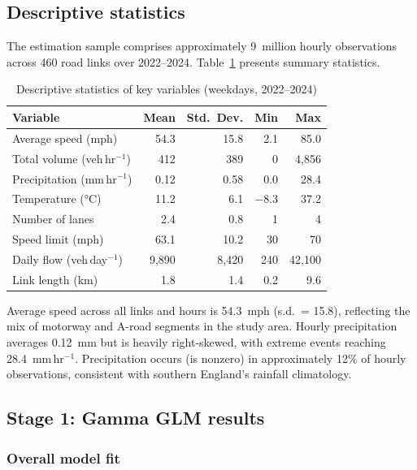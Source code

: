 \documentclass[review]{elsarticle}
\begin{document}
\subsection{Descriptive statistics}
\label{sec:results:desc}

The estimation sample comprises approximately 9~million hourly observations across 460 road links over 2022--2024. Table~\ref{tab:desc} presents summary statistics.

\begin{table}[htbp]
\centering
\caption{Descriptive statistics of key variables (weekdays, 2022--2024)}
\label{tab:desc}
\begin{tabular}{lrrrr}
\toprule
Variable & Mean & Std.\ Dev. & Min & Max \\
\midrule
Average speed (mph) & 54.3 & 15.8 & 2.1 & 85.0 \\
Total volume (veh\,hr$^{-1}$) & 412 & 389 & 0 & 4{,}856 \\
Precipitation (mm\,hr$^{-1}$) & 0.12 & 0.58 & 0.0 & 28.4 \\
Temperature (\si{\degreeCelsius}) & 11.2 & 6.1 & $-$8.3 & 37.2 \\
Number of lanes & 2.4 & 0.8 & 1 & 4 \\
Speed limit (mph) & 63.1 & 10.2 & 30 & 70 \\
Daily flow (veh\,day$^{-1}$) & 9{,}890 & 8{,}420 & 240 & 42{,}100 \\
Link length (km) & 1.8 & 1.4 & 0.2 & 9.6 \\
\bottomrule
\end{tabular}
\end{table}

Average speed across all links and hours is 54.3~mph (s.d.\ = 15.8), reflecting the mix of motorway and A-road segments in the study area. Hourly precipitation averages 0.12~mm but is heavily right-skewed, with extreme events reaching 28.4~mm\,hr$^{-1}$. Precipitation occurs (is nonzero) in approximately 12\% of hourly observations, consistent with southern England's rainfall climatology.


\subsection{Stage 1: Gamma GLM results}
\label{sec:results:glm}

\subsubsection{Overall model fit}
\end{document}
